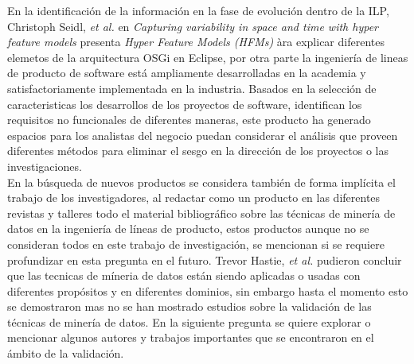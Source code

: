 En la identificación de la información en la fase de evolución dentro de la ILP, Christoph Seidl, \textit{et al.} en \textit{Capturing variability in space and time with hyper feature models} presenta \textit{Hyper Feature Models (HFMs)} àra explicar diferentes elemetos de la arquitectura OSGi en Eclipse, por otra parte la ingeniería de lineas de producto de software está ampliamente desarrolladas en la academia\cite{London2015} y satisfactoriamente implementada en la industria. Basados en la selección de caracteristicas los desarrollos de los proyectos de software, identifican los requisitos no funcionales de diferentes maneras\cite{Soares2014}, este producto ha generado espacios para los analistas del negocio puedan considerar el análisis que proveen diferentes métodos para eliminar el sesgo en la dirección de los proyectos o las investigaciones.\\
 En la búsqueda de nuevos productos se considera también de forma implícita el trabajo de los investigadores, al redactar como un producto en las diferentes revistas y talleres todo el material bibliográfico sobre las técnicas de minería de datos en la ingeniería de líneas de producto, estos productos aunque no se consideran todos en este trabajo de investigación, se mencionan  si se requiere profundizar en esta pregunta en el futuro. Trevor Hastie, \textit{et al.}\cite{Hastie2009}  pudieron concluir que las tecnicas de míneria de datos están siendo aplicadas o usadas con diferentes propósitos y en diferentes dominios, sin embargo hasta el momento esto se demostraron mas no se han mostrado estudios sobre la validación de las técnicas de minería de datos. En la siguiente pregunta se quiere explorar o mencionar algunos autores y trabajos importantes que se encontraron en el ámbito de la validación.
